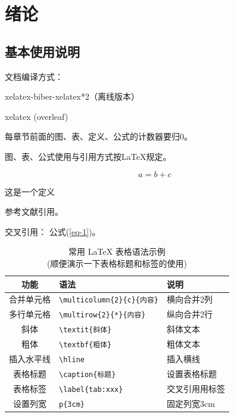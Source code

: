 \pagestyle{fancy}
\fancyhead{} %
\fancyhead[CE]{\songti \wuhao \showtitle} %
\fancyhead[CO]{\songti \wuhao \showcontenttitle \showcontenttitleSecond} %
\fancyfoot[C]{\xiaowuhao \thepage} %
\renewcommand{\headrulewidth}{1pt} %
\renewcommand{\footrulewidth}{0pt}

\section{绪论}
\setcounter{section}{1}
\setcounter{subsection}{0}
\setcounter{table}{0}
\setcounter{figure}{0}
\setcounter{equation}{0}
\setcounter{definition}{0}

\subsection{基本使用说明}
文档编译方式：

xelatex-biber-xelatex*2（离线版本）

xelatex (overleaf)

每章节前面的图、表、定义、公式的计数器要归0。

图、表、公式使用与引用方式按\LaTeX 规定。

\begin{equation}
    a=b+c \label{eq-1}
\end{equation}

\begin{definition}
    这是一个定义
\end{definition}

参考文献引用\cite{kai1979prospect}。

交叉引用： 公式(\ref{eq-1})。

\begin{table}[h!]
    \centering
    \caption{常用 \LaTeX{} 表格语法示例\\(顺便演示一下表格标题和标签的使用)}
    \label{tab:latex_example}
    \renewcommand{\arraystretch}{1.3}
    \begin{tabular}{cll}
        \toprule
        \textbf{功能} & \textbf{语法}                   & \textbf{说明} \\
        \midrule
        合并单元格       & \verb|\multicolumn{2}{c}{内容}| & 横向合并2列      \\
        多行单元格       & \verb|\multirow{2}{*}{内容}|    & 纵向合并2行      \\
        斜体          & \verb|\textit{斜体}|            & 斜体文本        \\
        粗体          & \verb|\textbf{粗体}|            & 粗体文本        \\
        插入水平线       & \verb|\hline|                 & 插入横线        \\
        表格标题        & \verb|\caption{标题}|           & 设置表格标题      \\
        表格标签        & \verb|\label{tab:xxx}|        & 交叉引用用标签     \\
        设置列宽        & \verb|p{3cm}|                 & 固定列宽3cm     \\
        \bottomrule
    \end{tabular}
\end{table}

